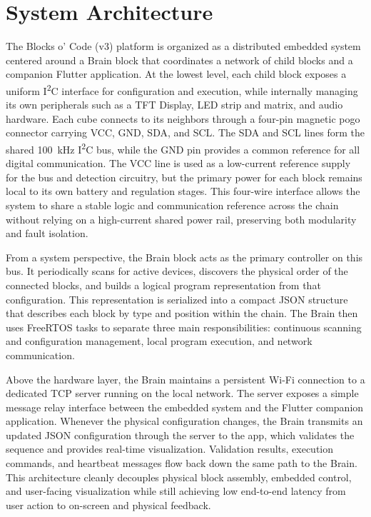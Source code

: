 \documentclass[10pt, conference]{IEEEtran}
\begin{document}
\section{System Architecture}
\label{sec:sysarch}
The Blocks o' Code (v3) platform is organized as a distributed embedded system centered around a Brain block that coordinates a network of child blocks and a companion Flutter application. At the lowest level, each child block exposes a uniform I\textsuperscript{2}C interface for configuration and execution, while internally managing its own peripherals such as a TFT Display, LED strip and matrix, and audio hardware. Each cube connects to its neighbors through a four-pin magnetic pogo connector carrying VCC, GND, SDA, and SCL. The SDA and SCL lines form the shared 100~kHz I\textsuperscript{2}C bus, while the GND pin provides a common reference for all digital communication. The VCC line is used as a low-current reference supply for the bus and detection circuitry, but the primary power for each block remains local to its own battery and regulation stages. This four-wire interface allows the system to share a stable logic and communication reference across the chain without relying on a high-current shared power rail, preserving both modularity and fault isolation.

From a system perspective, the Brain block acts as the primary controller on this bus. It periodically scans for active devices, discovers the physical order of the connected blocks, and builds a logical program representation from that configuration. This representation is serialized into a compact JSON structure that describes each block by type and position within the chain. The Brain then uses FreeRTOS tasks to separate three main responsibilities: continuous scanning and configuration management, local program execution, and network communication.

Above the hardware layer, the Brain maintains a persistent Wi-Fi connection to a dedicated TCP server running on the local network. The server exposes a simple message relay interface between the embedded system and the Flutter companion application. Whenever the physical configuration changes, the Brain transmits an updated JSON configuration through the server to the app, which validates the sequence and provides real-time visualization. Validation results, execution commands, and heartbeat messages flow back down the same path to the Brain. This architecture cleanly decouples physical block assembly, embedded control, and user-facing visualization while still achieving low end-to-end latency from user action to on-screen and physical feedback.
\end{document}
